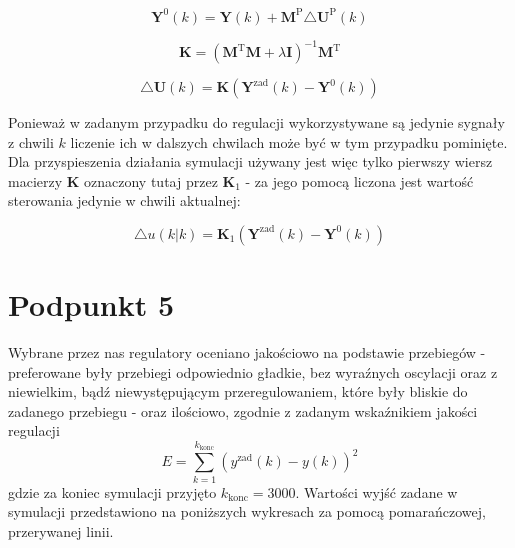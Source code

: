 \begin{equation}
\boldsymbol{Y}^{0}(k) = \boldsymbol{Y}(k) + \boldsymbol{M}^{\mathrm{P}} \triangle \boldsymbol{U}^{\mathrm{P}}(k)
\label{Y0k}
\end{equation}

\begin{equation}
\boldsymbol{K} = (\boldsymbol{M}^{\mathrm{T}} \boldsymbol{M} + \lambda \boldsymbol{I})^{-1} \boldsymbol{M}^{\mathrm{T}}
\label{Karray}
\end{equation}

\begin{equation}
\triangle \boldsymbol{U}(k) = \boldsymbol{K}(\boldsymbol{Y}^{\mathrm{zad}}(k) - \boldsymbol{Y}^{0}(k))
\label{dukdmc}
\end{equation}

Ponieważ w zadanym przypadku do regulacji wykorzystywane są jedynie sygnały z chwili $k$ liczenie ich w dalszych chwilach może być w tym przypadku pominięte. Dla przyspieszenia działania symulacji używany jest więc tylko pierwszy wiersz macierzy $\boldsymbol{K}$ oznaczony tutaj przez $\boldsymbol{K}_1$ - za jego pomocą liczona jest wartość sterowania jedynie w chwili aktualnej:

\begin{equation}
	\triangle u(k|k) = \boldsymbol{K}_1 (\boldsymbol{Y}^{\mathrm{zad}}(k) - \boldsymbol{Y}^{0}(k))
\end{equation}

\chapter{Podpunkt 5}
Wybrane przez nas regulatory oceniano jakościowo na podstawie przebiegów - preferowane były przebiegi odpowiednio gładkie, bez wyraźnych oscylacji oraz z niewielkim, bądź niewystępującym przeregulowaniem, które były bliskie do zadanego przebiegu - oraz ilościowo, zgodnie z zadanym wskaźnikiem jakości regulacji
\begin{equation}
E = \sum_{k=1}^{k_{\mathrm{konc}}}(y^{\mathrm{zad}}(k) - y(k))^2
\label{E}
\end{equation}
gdzie za koniec symulacji przyjęto $k_{\mathrm{konc}}=3000$. Wartości wyjść zadane w symulacji przedstawiono na poniższych wykresach za pomocą pomarańczowej, przerywanej linii.

